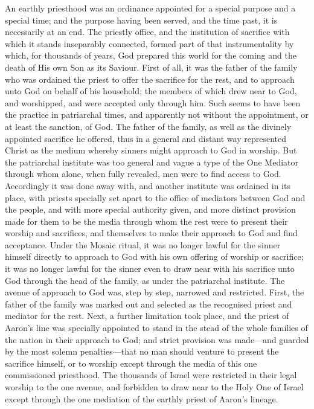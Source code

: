 \documentclass[
  english,
]{book}
\begin{document}
An earthly priesthood was an ordinance appointed for a special purpose and a special time; and the purpose having been served, and the time past, it is necessarily at an end. The priestly office, and the institution of sacrifice with which it stands inseparably connected, formed part of that instrumentality by which, for thousands of years, God prepared this world for the coming and the death of His own Son as its Saviour. First of all, it was the father of the family who was ordained the priest to offer the sacrifice for the rest, and to approach unto God on behalf of his household; the members of which drew near to God, and worshipped, and were accepted only through him. Such seems to have been the practice in patriarchal times, and apparently not without the appointment, or at least the sanction, of God. The father of the family, as well as the divinely appointed sacrifice he offered, thus in a general and distant way represented Christ as the medium whereby sinners might approach to God in worship. But the patriarchal institute was too general and vague a type of the One Mediator through whom alone, when fully revealed, men were to find access to God. Accordingly it was done away with, and another institute was ordained in its place, with priests specially set apart to the office of mediators between God and the people, and with more special authority given, and more distinct provision made for them to be the media through whom the rest were to present their worship and sacrifices, and themselves to make their approach to God and find acceptance. Under the Mosaic ritual, it was no longer lawful for the sinner himself directly to approach to God with his own offering of worship or sacrifice; it was no longer lawful for the sinner even to draw near with his sacrifice unto God through the head of the family, as under the patriarchal institute. The avenue of approach to God was, step by step, narrowed and restricted. First, the father of the family was marked out and selected as the recognised priest and mediator for the rest. Next, a further limitation took place, and the priest of Aaron's line was specially appointed to stand in the stead of the whole families of the nation in their approach to God; and strict provision was made---and guarded by the most solemn penalties---that no man should venture to present the sacrifice himself, or to worship except through the media of this one commissioned priesthood. The thousands of Israel were restricted in their legal worship to the one avenue, and forbidden to draw near to the Holy One of Israel except through the one mediation of the earthly priest of Aaron's lineage.
\end{document}
